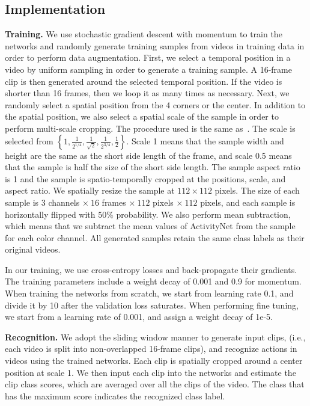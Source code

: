 \documentclass[10pt,twocolumn,letterpaper]{article}
\begin{document}
  \subsection{Implementation}
    \noindent \textbf{Training.}
      We use stochastic gradient descent with momentum to train the networks and
      randomly generate training samples from videos in training data in order to perform data augmentation.
      First, we select a temporal position in a video by uniform sampling in order to generate a training sample.
      A 16-frame clip is then generated around the selected temporal position.
      If the video is shorter than 16 frames, then we loop it as many times as necessary.
      Next, we randomly select a spatial position from the 4 corners or the center.
      In addition to the spatial position, we also select a spatial scale of the sample in order to perform multi-scale cropping.
      The procedure used is the same as~\cite{VeryDeepTwo}.
      The scale is selected from \(\left \{1, \frac{1}{2^{1/4}}, \frac{1}{\sqrt{2}}, \frac{1}{2^{3/4}}, \frac{1}{2}\right \} \).
      Scale 1 means that the sample width and height are the same as the short side length of the frame,
      and scale 0.5 means that the sample is half the size of the short side length.
      The sample aspect ratio is 1 and the sample is spatio-temporally cropped at the positions, scale, and aspect ratio.
      We spatially resize the sample at \(112 \times 112\) pixels.
      The size of each sample is
      \(3\) channels \(\times \ 16\) frames \(\times \ 112\) pixels \(\times \ 112\) pixels,
      and each sample is horizontally flipped with \( 50\% \) probability.
      We also perform mean subtraction,
      which means that we subtract the mean values of ActivityNet from the sample for each color channel.
      All generated samples retain the same class labels as their original videos.

      In our training, we use cross-entropy losses and back-propagate their gradients.
      The training parameters include a weight decay of 0.001 and 0.9 for momentum.
      When training the networks from scratch, we start from learning rate 0.1,
      and divide it by 10 after the validation loss saturates.
      When performing fine tuning, we start from a learning rate of 0.001, and assign a weight decay of 1e-5.

    \vspace{1mm}
    \noindent \textbf{Recognition.}
      We adopt the sliding window manner to generate input clips,
      (i.e., each video is split into non-overlapped 16-frame clips),
      and recognize actions in videos using the trained networks.
      Each clip is spatially cropped around a center position at scale 1.
      We then input each clip into the networks and
      estimate the clip class scores, which are averaged over all the clips of the video.
      The class that has the maximum score indicates the recognized class label.
\end{document}
